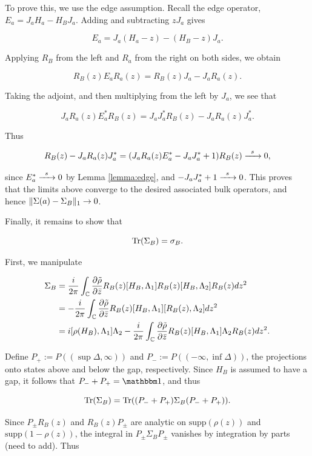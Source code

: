 \documentclass[12pt, letterpaper]{article}
\begin{document}
To prove this, we use the edge assumption. Recall the edge operator, $E_a = J_aH_a - H_BJ_a$. Adding and subtracting $zJ_a$ gives

\[E_a = J_a(H_a-z) - (H_B-z)J_a.\]

Applying $R_B$ from the left and $R_a$ from the right on both sides, we obtain 

\[R_B(z)E_aR_a(z) = R_B(z)J_a - J_aR_a(z).\]

Taking the adjoint, and then multiplying from the left by $J_a$, we see that 

\[J_aR_a(z)E_a^*R_B(z) = J_aJ_a^*R_B(z) - J_aR_a(z)J_a^*.\]

Thus

\[R_B(z) - J_aR_a(z)J_a^* = (J_aR_a(z)E_a^* - J_aJ_a^* + 1)R_B(z)  \xrightarrow{\enskip s \enskip} 0,\]

since $E^*_a \xrightarrow{\enskip s \enskip} 0$ by Lemma \ref{lemma:edge}, and $- J_aJ_a^* + 1 \xrightarrow{\enskip s \enskip}  0$. This proves that the limits above converge to the desired associated bulk operators, and hence $\lVert \Sigma(a) -  \Sigma_B \rVert_1 \to 0$.

Finally, it remains to show that  

\[\text{Tr}(\Sigma_B) = \sigma_B.\]

First, we manipulate

\[\begin{aligned}
\Sigma_B &= \frac{i}{2\pi}\int_{\mathbb{C}} \frac{\partial \tilde{\rho}}{\partial\bar{z}} R_B(z)[H_B,\Lambda_1]R_B(z)[H_B,\Lambda_2]R_B(z) dz^2\\
&= -\frac{i}{2\pi}\int_{\mathbb{C}} \frac{\partial \tilde{\rho}}{\partial\bar{z}} R_B(z)[H_B,\Lambda_1][R_B(z),\Lambda_2]dz^2\\
&= i[\rho(H_B),\Lambda_1]\Lambda_2 - \frac{i}{2\pi}\int_{\mathbb{C}} \frac{\partial \tilde{\rho}}{\partial\bar{z}} R_B(z)[H_B,\Lambda_1]\Lambda_2 R_B(z)dz^2.
\end{aligned}\]

Define $P_+ := P((\sup \Delta, \infty))$ and $P_- := P((-\infty, \inf \Delta))$, the projections onto states above and below the gap, respectively. Since $H_B$ is assumed to have a gap, it follows that $P_-+P_+=\One$, and thus 

\[\text{Tr}(\Sigma_B) = \text{Tr}((P_-+P_+)\Sigma_B (P_-+P_+)).\]

Since $P_\pm R_B(z)$ and $R_B(z) P_\pm$ are analytic on $\text{supp}(\rho(z))$ and $\text{supp}(1-\rho(z))$, the integral in $P_\pm \Sigma_B P_\pm$ vanishes by integration by parts (need to add). Thus
\end{document}
